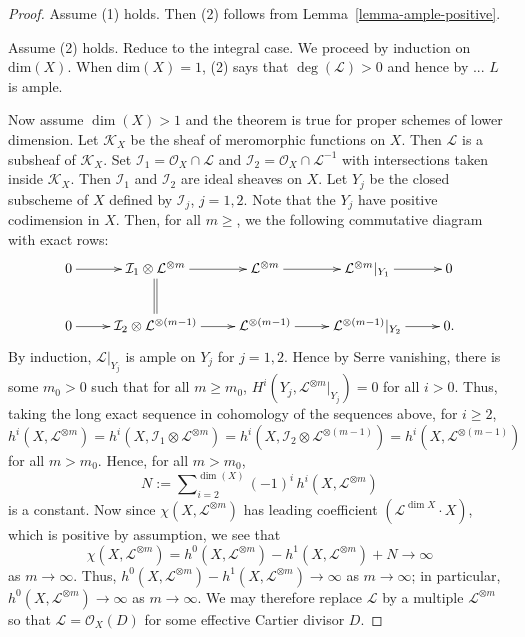 \begin{proof}
Assume (1) holds.
Then (2) follows from Lemma~\ref{lemma-ample-positive}.

Assume (2) holds.
Reduce to the integral case.
We proceed by induction on $\mathrm{dim}(X)$.
When $\mathrm{dim}(X) = 1$, (2) says that $\deg(\mathcal{L}) > 0$ and hence
by ... $L$ is ample.

Now assume $\dim(X) > 1$ and the theorem is true for proper schemes of lower
dimension.
Let $\mathcal{K}_X$ be the sheaf of meromorphic functions on $X$.
Then $\mathcal{L}$ is a subsheaf of $\mathcal{K}_X$.
Set $\mathcal{I}_1 = \mathcal{O}_X \cap \mathcal{L}$
and $\mathcal{I}_2 = \mathcal{O}_X \cap \mathcal{L}^{-1}$ with intersections
taken inside $\mathcal{K}_X$.
Then $\mathcal{I}_1$ and $\mathcal{I}_2$ are ideal sheaves on $X$.
Let $Y_j$ be the closed subscheme of $X$ defined by $\mathcal{I}_j$, $j = 1,2$.
Note that the $Y_j$ have positive codimension in $X$.
Then, for all $m \geq $, we the following commutative diagram with exact rows:
$$
\xymatrix{
  0 \ar[r]
    & \mathcal{I}_1 \otimes \mathcal{L}^{\otimes m} \ar[r] \ar@{=}[d]
    & \mathcal{L}^{\otimes m} \ar[r]
    & \mathcal{L}^{\otimes m}\rvert_{Y_1} \ar[r]
    & 0 \\
  0 \ar[r]
    & \mathcal{I}_2 \otimes \mathcal{L}^{\otimes (m-1)} \ar[r]
    & \mathcal{L}^{\otimes (m-1)} \ar[r]
    & \mathcal{L}^{\otimes (m-1)}\rvert_{Y_2} \ar[r]
    & 0.
}
$$
By induction, $\mathcal{L}\rvert_{Y_j}$ is ample on $Y_j$ for $j = 1,2$.
Hence by Serre vanishing, there is some $m_0 > 0$
such that for all $m \geq m_0$,
$H^i(Y_j,\mathcal{L}^{\otimes m}\rvert_{Y_j}) = 0$ for all $i > 0$.
Thus, taking the long exact sequence in cohomology of the sequences above,
for $i \geq 2$,
$$
  h^i(X,\mathcal{L}^{\otimes m})
    = h^i(X,\mathcal{I}_1 \otimes \mathcal{L}^{\otimes m})
    = h^i(X,\mathcal{I}_2 \otimes \mathcal{L}^{\otimes (m - 1)})
    = h^i(X,\mathcal{L}^{\otimes (m-1)})
$$
for all $m > m_0$.
Hence, for all $m > m_0$,
$$
N := \sum\nolimits_{i = 2}^{\dim(X)} (-1)^i\,h^i(X,\mathcal{L}^{\otimes m})
$$
is a constant.
Now since $\chi(X,\mathcal{L}^{\otimes m})$ has leading coefficient
$(\mathcal{L}^{\dim X} \cdot X)$, which is positive by assumption,
we see that
$$
  \chi(X,\mathcal{L}^{\otimes m})
    = h^0(X,\mathcal{L}^{\otimes m}) - h^1(X,\mathcal{L}^{\otimes m})
      + N \to \infty
$$
as $m \to \infty$. Thus,
$h^0(X,\mathcal{L}^{\otimes m}) - h^1(X,\mathcal{L}^{\otimes m}) \to \infty$
as $m \to \infty$; in particular,
$h^0(X,\mathcal{L}^{\otimes m}) \to \infty$ as $m \to \infty$.
We may therefore replace $\mathcal{L}$ by a multiple $\mathcal{L}^{\otimes m}$
so that $\mathcal{L} = \mathcal{O}_X(D)$ for some effective Cartier divisor
$D$.


\end{proof}
